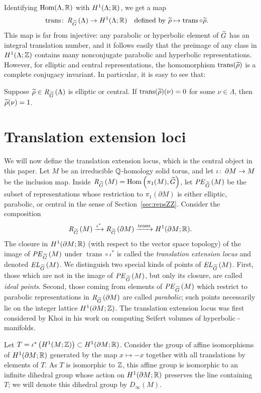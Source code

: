 \documentclass[tikz, sepfignums, defaultenums]{nmd/article}
\newcommand{\RGtil}[1]{\mathit{R}_{\Gtil}\left(#1\right)}
\newcommand{\RGtilPE}[1]{\mathit{PE}_{\Gtil}\left(#1\right)}
\newcommand{\inc}{\iota}
\DeclareMathOperator{\trans}{trans}
\newcommand{\TEL}[1]{\mathit{EL}_\Gtil\left(#1\right)}
\newcommand{\SymTEL}[1]{D_\infty\left(#1\right)}
\begin{document}
Identifying $\operatorname{Hom}(\Lambda, {\mathbb R})$ with
$H^1(\Lambda; {\mathbb R})$, we get a map
\[
\trans \maps \RGtil{\Lambda} \to H^1(\Lambda; \R)
   \mtext{defined by $\rhotil \mapsto \trans \circ \rhotil$.}
\]
This map is far from injective: any parabolic or hyperbolic element of
$\Gtil$ has an integral translation number, and it follows easily that
the preimage of any class in $H^1(\Lambda; {\mathbb Z})$ contains many
nonconjugate parabolic and hyperbolic representations. However, for
elliptic and central representations, the homomorphism
$\trans(\rhotil)$ is a complete conjugacy invariant.  In particular,
it is easy to see that:
\begin{lemma}\label{lem:trans_on_elliptic}
  Suppose $\rhotil \in \RGtil{\Lambda}$ is elliptic or
  central.  If $\trans(\rhotil)(\nu) = 0$ for some $\nu \in
  \Lambda$, then $\rhotil(\nu) = 1$.  
\end{lemma}

\section{Translation extension loci} 
\label{sec:TEL}

We will now define the translation extension locus, which is the
central object in this paper.  Let $M$ be an irreducible ${\mathbb Q}$-homology
solid torus, and let $\inc \maps \partial M \to M$ be the inclusion
map.  Inside $\RGtil{M} = \Hom\left(\pi_1(M), \Gtil\right)$, let
$\RGtilPE{M}$ be the subset of representations whose restriction to
$\pi_1(\partial M)$ is either elliptic, parabolic, or central in the
sense of Section~\ref{sec:repsZZ}.  Consider the composition
\[
\RGtil{M} \xrightarrow{\inc^*} \RGtil{\partial M}
\xrightarrow{\trans} H^1(\partial M; \R).
\]
The closure in $H^1(\partial M; {\mathbb R})$ (with respect to the vector space
topology) of the image of $\RGtilPE{M}$ under $\trans \circ \inc^*$ is
called the \emph{translation extension locus} and denoted $\TEL{M}$.
We distinguish two special kinds of points of $\TEL{M}$.  First, those
which are not in the image of $\RGtilPE{M}$, but only its closure, are
called \emph{ideal points}. Second, those coming from elements of
$\RGtilPE{M}$ which restrict to parabolic representations in
$\RGtil{\partial M}$ are called \emph{parabolic}; such points
necessarily lie on the integer lattice $H^1(\partial M; {\mathbb Z})$.  The
translation extension locus was first considered by Khoi
\cite{Khoi2003} in his work on computing Seifert volumes of hyperbolic
\3-manifolds.

Let $T = \inc^*\left(H^1(M; \Z)\right) \subset H^1(\partial M; \R)$.
Consider the group of affine isomorphisms of $H^1(\partial M; {\mathbb R})$
generated by the map $x \mapsto -x$ together with all translations by
elements of $T$.  As $T$ is isomorphic to ${\mathbb Z}$, this affine group is
isomorphic to an infinite dihedral group whose action on
$H^1(\partial M; {\mathbb R})$ preserves the line containing $T$; we will
denote this dihedral group by $\SymTEL{M}$.
\end{document}
